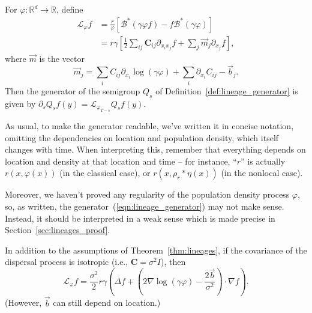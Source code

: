 \documentclass[EJP]{ejpecp} %
\newcommand{\IR}{\mathbb R}
\newcommand{\grad}{\nabla}
\newcommand{\DG}{\mathcal{B}}  %
\newcommand{\meanq}{\vec b}    %
\newcommand{\covq}{\mathbf{C}}     %
\newcommand{\kernel}{\rho}  %
\newcommand{\smooth}[1]{\kernel_{#1} \! * \!}  %
\newcommand{\Lgen}{\mathcal{L}}    %
\begin{document}
\begin{theorem} \label{thm:lineages}
    For $\varphi: \IR^d \to \IR$, define
    \begin{align}
        \label{eqn:lineage_generator}
        \Lgen_\varphi f
        &=
        \frac{r}{\varphi}
        \left[
            \DG^*(\gamma \varphi f) 
            - f \DG^* (\gamma \varphi)
        \right] \\
        &= \label{eqn:lineage_generator2}
        r\gamma
        \left[
            \frac{1}{2} \sum_{ij} \covq_{ij} \partial_{x_ix_j} f
            + \sum_j \vec{m}_j \partial_{x_j} f
        \right] ,
    \end{align}
    where $\vec{m}$ is the vector
    $$
    \vec{m}_j
    =
    \sum_i C_{ij} \partial_{x_i} \log(\gamma \varphi)
    + \sum_i \partial_{x_i} C_{ij}
    - \meanq_j .
    $$
    Then the generator of the semigroup $Q_s$
    of Definition~\ref{def:lineage_generator} is given by
	$\partial_sQ_sf(y)= \Lgen_{\varphi_{T-s}}Q_sf(y).$ 
\end{theorem}

\begin{remark}
As usual,
to make the generator readable, we've written it in concise notation,
omitting the dependencies on location and population density,
which itself changes with time.
When interpreting this,
remember that everything depends on location and density at that location and time --
for instance, ``$r$'' is actually $r(x, \varphi(x))$ (in the classical case),
or $r(x, \smooth{r} \eta(x))$ (in the nonlocal case).

Moreover, we haven't proved any regularity of the population density process $\varphi$,
so, as written, the generator~(\ref{eqn:lineage_generator})
may not make sense. Instead, it should be interpreted in a weak sense which is made precise
in Section~\ref{sec:lineages_proof}.
\end{remark}

\begin{corollary} \label{cor:lineages_simple}
    In addition to the assumptions of Theorem~\ref{thm:lineages},
    if the covariance of the dispersal process is isotropic
    (i.e., $\covq = \sigma^2 I$),
    then
    \begin{equation}
        \Lgen_\varphi f
        =
        \frac{\sigma^2}{2}
        r \gamma
        \left(
            \Delta f
            +
            \left(
                2 \grad \log(\gamma \varphi)
                - \frac{2 \meanq}{\sigma^2}
            \right)
            \cdot \grad f
        \right) .
    \end{equation}
    (However, $\meanq$ can still depend on location.)
\end{corollary}
\end{document}
